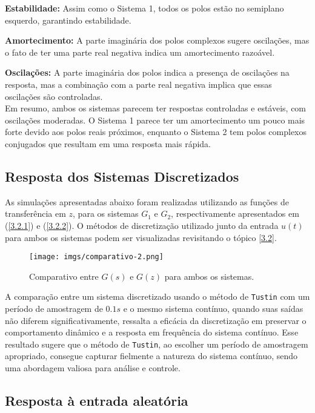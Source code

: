 \documentclass[a4paper,12pt]{article}
\begin{document}
\textbf{Estabilidade:} Assim como o Sistema 1, todos os polos estão no semiplano esquerdo, garantindo estabilidade.

\textbf{Amortecimento:} A parte imaginária dos polos complexos sugere oscilações, mas o fato de ter uma parte real negativa indica um amortecimento razoável.

\textbf{Oscilações:} A parte imaginária dos polos indica a presença de oscilações na resposta, mas a combinação com a parte real negativa implica que essas oscilações são controladas.\\

\noindent Em resumo, ambos os sistemas parecem ter respostas controladas e estáveis, com oscilações moderadas. O Sistema 1 parece ter um amortecimento um pouco mais forte devido aos polos reais próximos, enquanto o Sistema 2 tem polos complexos conjugados que resultam em uma resposta mais rápida.

\subsection{Resposta dos Sistemas Discretizados}\label{4.2}

As simulações apresentadas abaixo foram realizadas utilizando as funções de transferência em $z$, para os sistemas $G_1$ e $G_2$, respectivamente apresentados em (\ref{3.2.1}) e (\ref{3.2.2}). O métodos de discretização utilizado junto da entrada $u(t)$ para ambos os sistemas podem ser visualizadas revisitando o tópico \ref{3.2}.

\begin{figure}[h!]\label{fig3}
  \centering
  \texttt{[image: imgs/comparativo-2.png]}
  \caption{Comparativo entre $G(s)$ e $G(z)$ para ambos os sistemas.}
\end{figure}

A comparação entre um sistema discretizado usando o método de \texttt{Tustin} com um período de amostragem de $0.1s$ e o mesmo sistema contínuo, quando suas saídas não diferem significativamente, ressalta a eficácia da discretização em preservar o comportamento dinâmico e a resposta em frequência do sistema contínuo. Esse resultado sugere que o método de \texttt{Tustin}, ao escolher um período de amostragem apropriado, consegue capturar fielmente a natureza do sistema contínuo, sendo uma abordagem valiosa para análise e controle.

\subsection{Resposta à entrada aleatória}\label{4.3}
\end{document}
